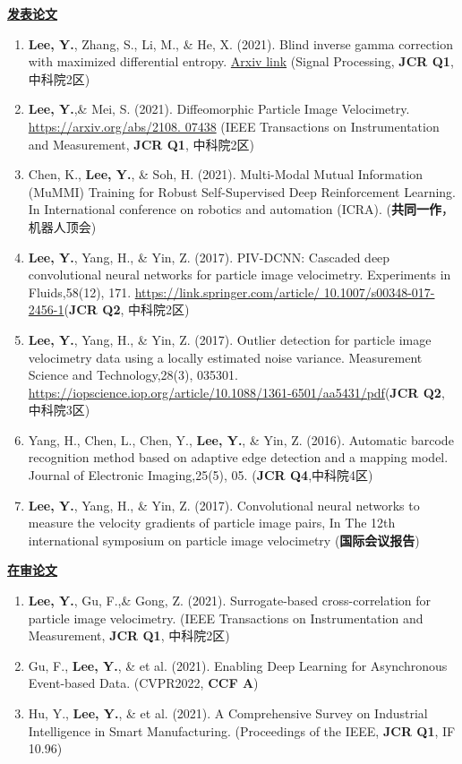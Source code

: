 \documentclass[a4paper,fontsize=11pt]{scrartcl} %
\newcommand{\stitle}[1]{
	\noindent\underline{\textbf{#1}} \normalsize\par}
\begin{document}
\stitle{发表论文}
\begin{enumerate}
	\setlength\itemsep{0.0cm}
	\item \textbf{Lee, Y.}, Zhang, S., Li, M., \& He, X. (2021). Blind inverse gamma correction with maximized differential entropy. \href{https://arxiv.org/abs/2007.02246}{Arxiv link}  (Signal Processing, \textbf{JCR Q1}, 中科院2区)
	\item \textbf{Lee, Y.},\& Mei, S. (2021). Diffeomorphic Particle Image Velocimetry.  \href{https://arxiv.org/abs/2108.07438}{https://arxiv.org/abs/2108. 07438} (IEEE Transactions on Instrumentation and Measurement, \textbf{JCR Q1}, 中科院2区)
	\item Chen, K., \textbf{Lee, Y.}, \& Soh, H. (2021). Multi-Modal Mutual Information (MuMMI) Training for Robust Self-Supervised Deep Reinforcement Learning. In International conference on robotics and automation (ICRA). (\textbf{共同一作}，机器人顶会)
	\item \textbf{Lee, Y.}, Yang, H., \& Yin, Z. (2017). PIV-DCNN: Cascaded deep convolutional neural networks for particle image velocimetry. Experiments in Fluids,58(12), 171. \href{https://link.springer.com/article/10.1007/s00348-017-2456-1}{https://link.springer.com/article/ 10.1007/s00348-017-2456-1}(\textbf{JCR Q2}, 中科院2区)
	\item \textbf{Lee, Y.}, Yang, H., \& Yin, Z. (2017). Outlier detection for particle image velocimetry data using a locally estimated noise variance. Measurement Science and Technology,28(3), 035301. \href{https://iopscience.iop.org/article/10.1088/1361-6501/aa5431/pdf}{https://iopscience.iop.org/article/10.1088/1361-6501/aa5431/pdf}(\textbf{JCR Q2}, 中科院3区)
	\item Yang, H., Chen, L., Chen, Y., \textbf{Lee, Y.}, \& Yin, Z. (2016). Automatic barcode recognition method based on adaptive edge detection and a mapping model. Journal of Electronic Imaging,25(5), 05. (\textbf{JCR Q4},中科院4区)
	\item \textbf{Lee, Y.}, Yang, H., \& Yin, Z. (2017). Convolutional neural networks to measure the velocity gradients of particle image pairs, In The 12th international symposium on particle image velocimetry (\textbf{国际会议报告})
\end{enumerate}

\stitle{在审论文}
\begin{enumerate}
	\item \textbf{Lee, Y.}, Gu, F.,\& Gong, Z. (2021). Surrogate-based cross-correlation for particle image velocimetry. (IEEE Transactions on Instrumentation and Measurement, \textbf{JCR Q1}, 中科院2区)
	\item Gu, F., \textbf{Lee, Y.}, \& et al. (2021). Enabling Deep Learning for Asynchronous Event-based Data.  (CVPR2022, \textbf{CCF A})
	\item Hu, Y., \textbf{Lee, Y.}, \& et al. (2021). A Comprehensive Survey on Industrial Intelligence in Smart Manufacturing.  (Proceedings of the IEEE, \textbf{JCR Q1}, IF 10.96)
\end{enumerate}
\end{document}

